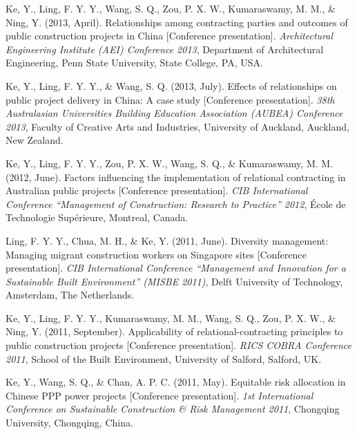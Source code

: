 \documentclass[11pt,a4paper]{report} %
\begin{document}
\begin{tablist}
        \item[2013] \tab{}Ke, Y., Ling, F. Y. Y., Wang, S. Q., Zou, P. X. W., Kumaraswamy, M. M., \& Ning, Y. (2013, April). Relationships among contracting parties and outcomes of public construction projects in China [Conference presentation]. \textit{Architectural Engineering Institute (AEI) Conference 2013}, Department of Architectural Engineering, Penn State University, State College, PA, USA.
        
        \item[2013] \tab{}Ke, Y., Ling, F. Y. Y., \& Wang, S. Q. (2013, July). Effects of relationships on public project delivery in China: A case study [Conference presentation]. \textit{38th Australasian Universities Building Education Association (AUBEA) Conference 2013}, Faculty of Creative Arts and Industries, University of Auckland, Auckland, New Zealand.
        
        \item[2012] \tab{}Ke, Y., Ling, F. Y. Y., Zou, P. X. W., Wang, S. Q., \& Kumaraswamy, M. M. (2012, June). Factors influencing the implementation of relational contracting in Australian public projects [Conference presentation]. \textit{CIB International Conference “Management of Construction: Research to Practice” 2012}, École de Technologie Supérieure, Montreal, Canada.
        
        \item[2011] \tab{}Ling, F. Y. Y., Chua, M. H., \& Ke, Y. (2011, June). Diversity management: Managing migrant construction workers on Singapore sites [Conference presentation]. \textit{CIB International Conference “Management and Innovation for a Sustainable Built Environment” (MISBE 2011)}, Delft University of Technology, Amsterdam, The Netherlands.
        
        \item[2011] \tab{}Ke, Y., Ling, F. Y. Y., Kumaraswamy, M. M., Wang, S. Q., Zou, P. X. W., \& Ning, Y. (2011, September). Applicability of relational-contracting principles to public construction projects [Conference presentation]. \textit{RICS COBRA Conference 2011}, School of the Built Environment, University of Salford, Salford, UK.
        
        \item[2011] \tab{}Ke, Y., Wang, S. Q., \& Chan, A. P. C. (2011, May). Equitable risk allocation in Chinese PPP power projects [Conference presentation]. \textit{1st International Conference on Sustainable Construction \& Risk Management 2011}, Chongqing University, Chongqing, China.
        

\end{tablist}
\end{document}
